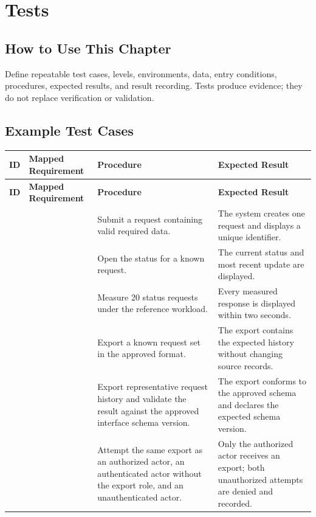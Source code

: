 \chapter{Tests}
\section{How to Use This Chapter}
Define repeatable test cases, levels, environments, data, entry conditions, procedures, expected results, and result recording. Tests produce evidence; they do not replace verification or validation.
\section{Example Test Cases}
\begin{tabularx}{\linewidth}{L{2.1cm}L{3.0cm}YL{5.0cm}}
\caption{Test Case Examples\label{Table:TestCaseExamples}}\\
\toprule
\textbf{ID} & \textbf{Mapped Requirement} & \textbf{Procedure} & \textbf{Expected Result}\\
\midrule
\endfirsthead
\toprule
\textbf{ID} & \textbf{Mapped Requirement} & \textbf{Procedure} & \textbf{Expected Result}\\
\midrule
\endhead
{} &  & Submit a request containing valid required data. & The system creates one request and displays a unique identifier.\\
 &  & Open the status for a known request. & The current status and most recent update are displayed.\\
 &  & Measure 20 status requests under the reference workload. & Every measured response is displayed within two seconds.\\
 &  & Export a known request set in the approved format. & The export contains the expected history without changing source records.\\
 &  & Export representative request history and validate the result against the approved interface schema version. & The export conforms to the approved schema and declares the expected schema version.\\
 &  & Attempt the same export as an authorized actor, an authenticated actor without the export role, and an unauthenticated actor. & Only the authorized actor receives an export; both unauthorized attempts are denied and recorded.\\

\end{tabularx}
